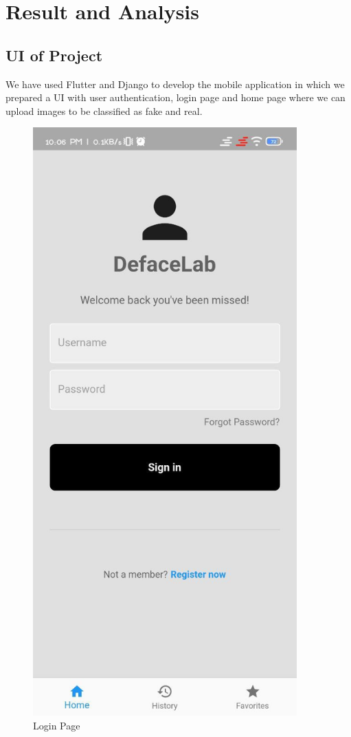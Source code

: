 \section{Result and Analysis}
\subsection{UI of Project}
We have used Flutter and Django to develop the mobile application in which we prepared a
UI with user authentication, login page and home page where we can upload images to be classified as fake and real.

\begin{figure}[ht]
    \centering
    \includegraphics[width= 4in, height =7 in ]{img/loginpage.jpg}
    \caption{Login Page }
\end{figure}

